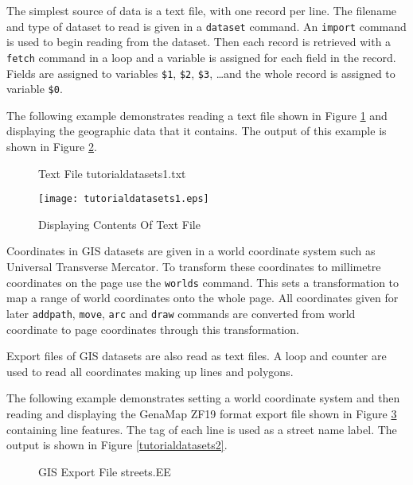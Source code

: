 The simplest source of data is a text file, with one record per line.  The
filename and type of dataset to read is given in a \texttt{dataset} command.
An \texttt{import} command is used to begin reading from the dataset.  Then
each record is retrieved with a \texttt{fetch} command in a loop and a variable
is assigned for each field in the record.  Fields are assigned to variables
\texttt{\$1}, \texttt{\$2}, \texttt{\$3}, \dots and the whole record is
assigned to variable \texttt{\$0}.

The following example demonstrates reading a text file shown in Figure
\ref{tutorialdatasets1txt} and displaying the
geographic data that it contains.  The output of this example is shown in
Figure \ref{tutorialdatasets1}.

\begin{figure}[h]

\caption{Text File tutorialdatasets1.txt}
\label{tutorialdatasets1txt}
\end{figure}



\begin{figure}[h]
\texttt{[image: tutorialdatasets1.eps]}
\caption{Displaying Contents Of Text File}
\label{tutorialdatasets1}
\end{figure}

Coordinates in GIS datasets are given in a world coordinate system such as
Universal Transverse Mercator.  To transform these coordinates to millimetre
coordinates on the page use the \texttt{worlds} command.  This sets a
transformation to map a range of world coordinates onto the whole page.  All
coordinates given for later \texttt{addpath}, \texttt{move}, \texttt{arc} and
\texttt{draw} commands are converted from world coordinate to page coordinates
through this transformation.

Export files of GIS datasets are also read as text files.  A loop and counter
are used to read all coordinates making up lines and polygons.

The following example demonstrates setting a world coordinate system and then
reading and displaying the GenaMap ZF19 format export file shown in Figure
\ref{streetsEE} containing line
features.  The tag of each line is used as a street name label.
The output is shown in Figure \ref{tutorialdatasets2}.

\begin{figure}[h]

\caption{GIS Export File streets.EE}
\label{streetsEE}
\end{figure}

